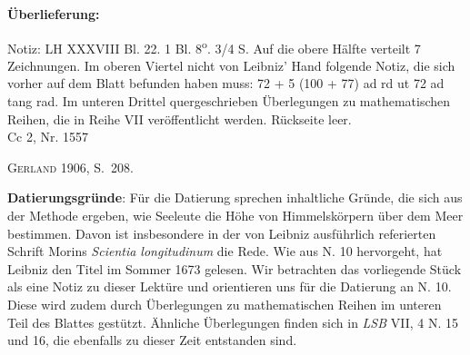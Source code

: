       
               
                \begin{ledgroupsized}[r]{120mm}
                \footnotesize 
                \pstart                
                \noindent\textbf{\"{U}berlieferung:}   
                \pend
                \end{ledgroupsized}
            
              
                            \begin{ledgroupsized}[r]{114mm}
                            \footnotesize 
                            \pstart \parindent -6mm
                            Notiz: LH XXXVIII Bl. 22. 1 Bl. 8\textsuperscript{o}. 3/4 S. Auf die obere H\"{a}lfte verteilt 7 Zeichnungen. Im oberen Viertel nicht von Leibniz' Hand folgende Notiz, die sich vorher auf dem Blatt befunden haben muss: 72 + 5 (100 + 77) ad rd ut 72 ad tang rad. Im unteren Drittel quergeschrieben \"{U}berlegungen zu mathematischen Reihen, die in Reihe VII ver\"{o}ffentlicht werden. R\"{u}ckseite leer.\\Cc 2, Nr. 1557 \pend
                            \end{ledgroupsized}
              
                            \begin{ledgroupsized}[r]{114mm}
                            \footnotesize 
                            \pstart \parindent -6mm
                            \cite{00243}\textsc{Gerland} 1906, S.~208. \pend
                            \end{ledgroupsized}
                \vspace*{5mm}
                \begin{ledgroup}
                \footnotesize 
                \pstart
            \noindent\footnotesize{\textbf{Datierungsgr\"{u}nde}: F\"{u}r die Datierung sprechen inhaltliche Gr\"{u}nde, die sich aus der Methode ergeben, wie Seeleute die H\"{o}he von Himmelsk\"{o}rpern \"{u}ber dem Meer bestimmen. Davon ist insbesondere in der von Leibniz ausf\"{u}hrlich referierten Schrift Morins \textit{Scientia longitudinum} die Rede. Wie aus N. 10 hervorgeht, hat Leibniz den Titel im Sommer 1673 gelesen. Wir betrachten das vorliegende St\"{u}ck als eine Notiz zu dieser Lekt\"{u}re und orientieren uns f\"{u}r die Datierung an N. 10. Diese wird zudem durch \"{U}berlegungen zu mathematischen Reihen im unteren Teil des Blattes gest\"{u}tzt. \"{A}hnliche \"{U}berlegungen finden sich in \textit{LSB} VII, 4 N. 15 und 16, die ebenfalls zu dieser Zeit entstanden sind.}
                \pend
                \end{ledgroup}
            
